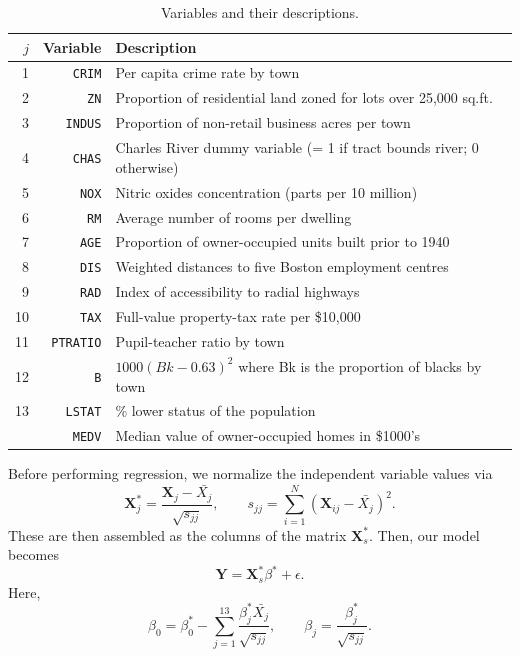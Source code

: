 \documentclass[10pt]{article}
\renewcommand{\vec}{\bm}
\begin{document}
    \begin{table}[H]
    \centering
    \begin{tabular}{|r|r|l|} \hline
        $j$ & Variable          & Description \\\hline
          1 & \texttt{CRIM}     & Per capita crime rate by town \\
          2 & \texttt{ZN}       & Proportion of residential land zoned for lots over 25,000 sq.ft. \\
          3 & \texttt{INDUS}    & Proportion of non-retail business acres per town \\
          4 & \texttt{CHAS}     & Charles River dummy variable (= 1 if tract bounds river; 0 otherwise) \\
          5 & \texttt{NOX}      & Nitric oxides concentration (parts per 10 million) \\
          6 & \texttt{RM}       & Average number of rooms per dwelling \\
          7 & \texttt{AGE}      & Proportion of owner-occupied units built prior to 1940 \\
          8 & \texttt{DIS}      & Weighted distances to five Boston employment centres \\
          9 & \texttt{RAD}      & Index of accessibility to radial highways \\
         10 & \texttt{TAX}      & Full-value property-tax rate per \$10,000 \\
         11 & \texttt{PTRATIO}  & Pupil-teacher ratio by town \\
         12 & \texttt{B}        & $1000(Bk - 0.63)^2$ where Bk is the proportion of blacks by town \\
         13 & \texttt{LSTAT}    & \% lower status of the population \\
            & \texttt{MEDV}     & Median value of owner-occupied homes in \$1000's \\\hline
    \end{tabular}
    \vspace{1em}
    \caption{Variables and their descriptions.}
    \label{tab:variables}
    \end{table}

    Before performing regression, we normalize the independent variable values via
    \[
        \vec{X}_j^* = \frac{\vec{X}_j - \bar{X_j}}{\sqrt{s_{jj}}}, \qquad
        s_{jj} = \sum_{i = 1}^N (\vec{X}_{ij} - \bar{X_j})^2.
    \] These are then assembled as the columns of the matrix $\vec{X}_s^*$. Then, our
    model becomes \[
        \vec{Y} = \vec{X}_s^*\beta^* + \epsilon.
    \] Here, \[
        \beta_0 = \beta_0^* - \sum_{j = 1}^{13}
        \frac{\beta_j^*\bar{X_j}}{\sqrt{s_{jj}}}, \qquad
        \beta_j = \frac{\beta_j^*}{\sqrt{s_{jj}}}.
    \]
\end{document}
